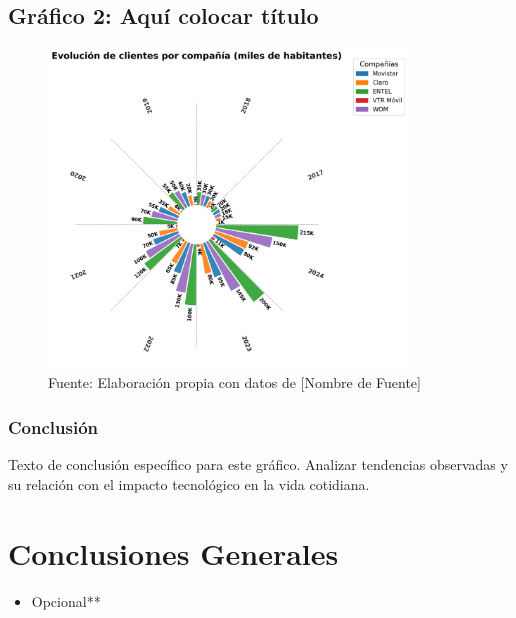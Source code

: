 \documentclass[12pt, a4paper]{article}
\begin{document}
\subsection*{Gráfico 2: Aquí colocar título}
\begin{figure}[H]
    \centering
    \includegraphics[width=0.85\textwidth]{images/graph2_JG.png}
    \caption{Fuente: Elaboración propia con datos de [Nombre de Fuente]}
\end{figure}

\subsubsection*{Conclusión}
Texto de conclusión específico para este gráfico. Analizar tendencias observadas y su relación con el impacto tecnológico en la vida cotidiana.


\section*{Conclusiones Generales}
\begin{itemize}
    \item Opcional**
  
\end{itemize}
\end{document}
